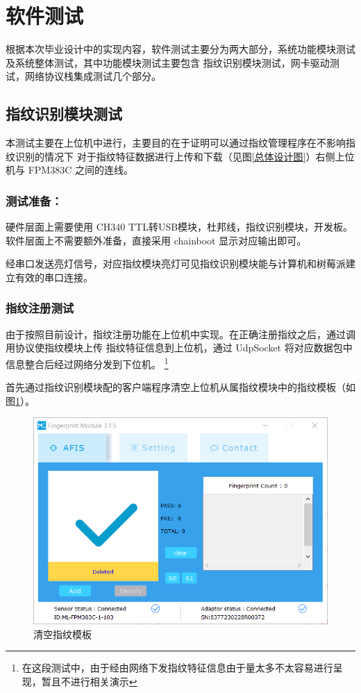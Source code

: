 \section{软件测试}

    根据本次毕业设计中的实现内容，软件测试主要分为两大部分，系统功能模块测试及系统整体测试，其中功能模块测试主要包含
    指纹识别模块测试，网卡驱动测试，网络协议栈集成测试几个部分。

    \subsection{指纹识别模块测试}

    本测试主要在上位机中进行，主要目的在于证明可以通过指纹管理程序在不影响指纹识别的情况下
    对于指纹特征数据进行上传和下载（见图\ref{总体设计图}）右侧上位机与 FPM383C 之间的连线。

    \subsubsection*{测试准备：}
    硬件层面上需要使用 CH340 TTL转USB模块，杜邦线，指纹识别模块，开发板。
    软件层面上不需要额外准备，直接采用 chainboot 显示对应输出即可。

    经串口发送亮灯信号，对应指纹模块亮灯可见指纹识别模块能与计算机和树莓派建立有效的串口连接。

    \subsubsection{指纹注册测试}
    
    由于按照目前设计，指纹注册功能在上位机中实现。在正确注册指纹之后，通过调用协议使指纹模块上传
    指纹特征信息到上位机，通过 UdpSocket 将对应数据包中信息整合后经过网络分发到下位机。
    \footnote{在这段测试中，由于经由网络下发指纹特征信息由于量太多不太容易进行呈现，暂且不进行相关演示}

    首先通过指纹识别模块配的客户端程序清空上位机从属指纹模块中的指纹模板（如图\ref{fig::清空指纹模板}）。

    \begin{figure}[ht]
        \centering
        \includegraphics[scale=0.8]{./imgs/清空指纹模板.png}
        \caption{清空指纹模板}    \label{fig::清空指纹模板}
    \end{figure}

